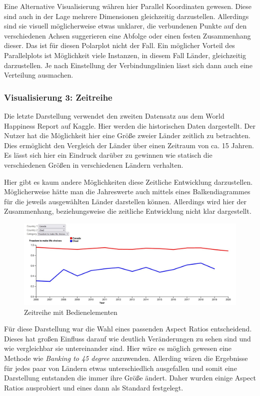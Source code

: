 Eine Alternative Visualisierung währen hier Parallel Koordinaten gewesen. Diese sind auch in der Lage mehrere Dimensionen gleichzeitig darzustellen. Allerdings sind sie visuell möglicherweise etwas unklarer, die verbundenen Punkte auf den verschiedenen Achsen suggerieren eine Abfolge oder einen festen Zusammenhang dieser. Das ist für diesen Polarplot nicht der Fall. Ein möglicher Vorteil des Parallelplots ist Möglichkeit viele Instanzen, in diesem Fall Länder, gleichzeitig darzustellen. Je nach Einstellung der Verbindungslinien lässt sich dann auch eine Verteilung ausmachen. 

\subsubsection{Visualisierung 3: Zeitreihe}

Die letzte Darstellung verwendet den zweiten Datensatz aus dem World Happiness Report auf Kaggle. Hier werden die historischen Daten dargestellt. Der Nutzer hat die Möglichkeit hier eine Größe zweier Länder zeitlich zu betrachten. Dies ermöglicht den Vergleich der Länder über einen Zeitraum von ca. 15 Jahren. Es lässt sich hier ein Eindruck darüber zu gewinnen wie statisch die verschiedenen Größen in verschiedenen Ländern verhalten. 

Hier gibt es kaum andere Möglichkeiten diese Zeitliche Entwicklung darzustellen. Möglicherweise hätte man die Jahreswerte auch mittels eines Balkendiagrammes für die jeweils ausgewählten Länder darstellen können. Allerdings wird hier der Zusammenhang, beziehungsweise die zeitliche Entwicklung nicht klar dargestellt. \\

\begin{figure}[h]
 \centering
 \includegraphics[width = \textwidth]{img/timeseries.jpg}
 \caption{Zeitreihe mit Bedienelementen}
 \label{fig:timeseries}
\end{figure}

Für diese Darstellung war die Wahl eines passenden Aspect Ratios entscheidend. Dieses hat großen Einfluss darauf wie deutlich Veränderungen zu sehen sind und wie vergleichbar sie untereinander sind. Hier wäre es möglich gewesen eine  Methode wie \textit{Banking to 45 degree} anzuwenden. Allerding wären die Ergebnisse für jedes paar von Ländern etwas unterschiedlich ausgefallen und somit eine Darstellung entstanden die immer ihre Größe ändert. Daher wurden einige Aspect Ratios ausprobiert und eines dann als Standard festgelegt.\\


